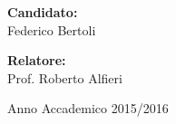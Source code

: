 \begin{titlepage}
\begin{center}
\begin{Large}
      \vspace{2.8cm}
	  
	  \begin{minipage}{.45\linewidth}
		  \begin{flushleft}
		    \textbf{Candidato:} \\
			Federico Bertoli
		  	 \end{flushleft}
	  \end{minipage}
	  \hfill
	  \begin{minipage}{.45\linewidth}
		  \begin{flushright}
		    { \textbf{Relatore:} } \\
		    Prof. Roberto Alfieri
		  \end{flushright}
	   \end{minipage}
      
      \vspace{2.0cm}
      
      Anno Accademico 2015/2016
    \end{Large}

  \end{center}

\end{titlepage}
